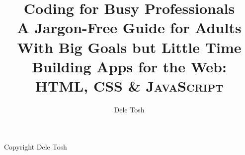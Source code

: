 \documentclass[titlepage]{book}
\title{%
    Coding for Busy Professionals \\
    \large A Jargon-Free Guide for Adults With Big Goals but Little Time \\
    Building Apps for the Web: \textsc{HTML, CSS \& JavaScript}
}
\author{Dele Tosh}
\begin{document}
    \frontmatter
%
    \maketitle
    \thispagestyle{empty}
    Copyright  Dele Tosh
    \tableofcontents

    \mainmatter
    
    
    
    
    

    \printbibliography
\end{document}
